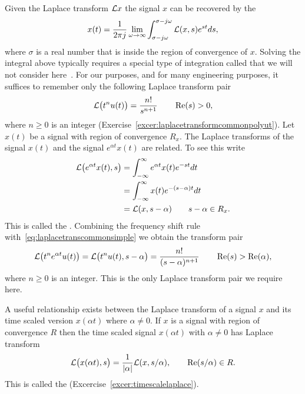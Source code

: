 Given the Laplace transform $\mathcal L x $ the signal $x$ can be recovered by the 
\[
x(t) = \frac{1}{2\pi j} \lim_{\omega \rightarrow\infty} \int_{\sigma - j\omega}^{\sigma - j\omega} \mathcal L(x,s) e^{st} ds,
\]
where $\sigma$ is a real number that is inside the region of convergence of $x$.  Solving the integral above typically requires a special type of integration called  that we will not consider here~\citep{Stewart_ComplexAnalysis_2004}.  For our purposes, and for many engineering purposes, it suffices to remember only the following Laplace transform pair
\begin{equation}\label{eq:laplacetranscommonsimple}
\mathcal L\big(t^n u(t)\big) = \frac{n!}{s^{n+1}} \qquad \operatorname{Re}(s) > 0,
\end{equation}
where $n \geq 0$ is an integer (Exercise~\ref{excer:laplacetransformcommonpolyut}).  Let $x(t)$ be a signal with region of convergence $R_x$.  The Laplace transforms of the signal $x(t)$ and the signal $e^{\alpha t}x(t)$ are related.  To see this write
\begin{align}
\mathcal L\big( e^{\alpha t} x(t), s\big) &= \int_{-\infty}^{\infty} e^{\alpha t} x(t)  e^{-s t} dt \nonumber \\
&= \int_{-\infty}^{\infty} x(t)  e^{-(s-\alpha) t} dt \nonumber \\
&=  \mathcal L(x, s-\alpha) \qquad s - \alpha \in R_x. \label{eq:freqshiftrule}
\end{align}
This is called the .  Combining the frequency shift rule with~\eqref{eq:laplacetranscommonsimple} we obtain the transform pair
\begin{equation}\label{eq:laplacetneucommon}
\mathcal L\big( t^n e^{\alpha t} u(t) \big) = \mathcal L\big(t^n u(t), s - \alpha\big) = \frac{n!}{(s-\alpha)^{n+1}} \qquad \operatorname{Re}(s) > \operatorname{Re}(\alpha),
\end{equation}
where $n \geq 0$ is an integer.  This is the only Laplace transform pair we require here.  

A useful relationship exists between the Laplace transform of a signal $x$ and its time scaled version $x(\alpha t)$ where $\alpha \neq 0$.  If $x$ is a signal with region of convergence $R$ then the time scaled signal $x(\alpha t)$ with $\alpha \neq 0$ has Laplace transform
\begin{equation}\label{eq:timescalingpropertrylaplacetrans}
 \mathcal L\big(x(\alpha t),s\big) = \frac{1}{\left\vert \alpha \right\vert}\mathcal L(x, s/\alpha), \qquad \operatorname{Re}(s/\alpha) \in R.
\end{equation}
This is called the  (Excercise~\ref{excer:timescalelaplace}).

